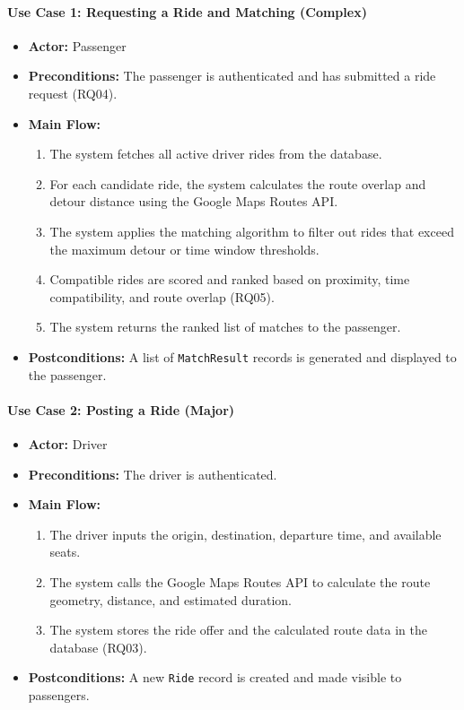 \paragraph{Use Case 1: Requesting a Ride and Matching (Complex)}
\begin{itemize}
  \item \textbf{Actor:} Passenger
  \item \textbf{Preconditions:} The passenger is authenticated and has submitted a ride request (RQ04).
  \item \textbf{Main Flow:}
  \begin{enumerate}
    \item The system fetches all active driver rides from the database.
    \item For each candidate ride, the system calculates the route overlap and detour distance using the Google Maps Routes API.
    \item The system applies the matching algorithm to filter out rides that exceed the maximum detour or time window thresholds.
    \item Compatible rides are scored and ranked based on proximity, time compatibility, and route overlap (RQ05).
    \item The system returns the ranked list of matches to the passenger.
  \end{enumerate}
  \item \textbf{Postconditions:} A list of \texttt{MatchResult} records is generated and displayed to the passenger.
\end{itemize}

\paragraph{Use Case 2: Posting a Ride (Major)}
\begin{itemize}
  \item \textbf{Actor:} Driver
  \item \textbf{Preconditions:} The driver is authenticated.
  \item \textbf{Main Flow:}
  \begin{enumerate}
    \item The driver inputs the origin, destination, departure time, and available seats.
    \item The system calls the Google Maps Routes API to calculate the route geometry, distance, and estimated duration.
    \item The system stores the ride offer and the calculated route data in the database (RQ03).
  \end{enumerate}
  \item \textbf{Postconditions:} A new \texttt{Ride} record is created and made visible to passengers.
\end{itemize}

